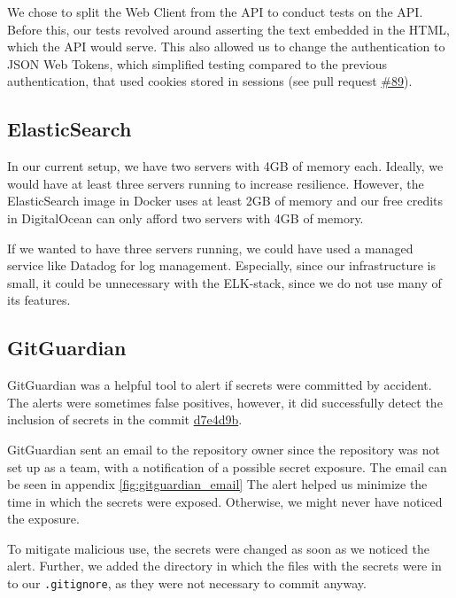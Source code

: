\documentclass{article}
\begin{document}
\noindent We chose to split the Web Client from the API to conduct tests on the API. Before this, our tests revolved around asserting the text embedded in the HTML, which the API would serve. This also allowed us to change the authentication to JSON Web Tokens, which simplified testing compared to the previous authentication, that used cookies stored in sessions (see pull request \href{https://github.com/aske-w/itu-minitwit/pull/89}{{\#89}}).

\subsection{ElasticSearch}
In our current setup, we have two servers with 4GB of memory each. Ideally, we would have at least three servers running to increase resilience. However, the ElasticSearch image in Docker uses at least 2GB of memory and our free credits in DigitalOcean can only afford two servers with 4GB of memory. 

If we wanted to have three servers running, we could have used a managed service like Datadog for log management. Especially, since our infrastructure is small, it could be unnecessary with the ELK-stack, since we do not use many of its features. 

\subsection{GitGuardian}
GitGuardian was a helpful tool to alert if secrets were committed by accident. The alerts were sometimes false positives, however, it did successfully detect the inclusion of secrets in the commit \href{https://github.com/aske-w/itu-minitwit/commit/d7e4d9b96f1ee629949f01fc11580a61edf16e92#diff-1814a5376f0ff1c06a3246d8f862309b7539f129dfd197ae73f95c8f87750678R8}{d7e4d9b}.

GitGuardian sent an email to the repository owner since the repository was not set up as a team, with a notification of a possible secret exposure. The email can be seen in appendix \ref{fig:gitguardian_email}
The alert helped us minimize the time in which the secrets were exposed. Otherwise, we might never have noticed the exposure.

To mitigate malicious use, the secrets were changed as soon as we noticed the alert. Further, we added the directory in which the files with the secrets were in to our \texttt{.gitignore}, as they were not necessary to commit anyway.
\end{document}
